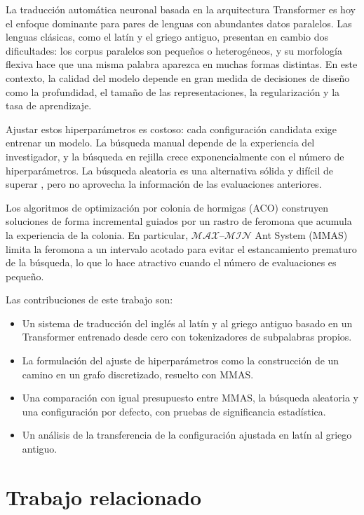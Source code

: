 \documentclass[conference]{IEEEtran}
\newcommand{\mmas}{$\mathcal{MAX}$--$\mathcal{MIN}$ Ant System}
\begin{document}
La traducción automática neuronal basada en la arquitectura Transformer
\cite{vaswani2017attention} es hoy el enfoque dominante para pares de
lenguas con abundantes datos paralelos. Las lenguas clásicas, como el
latín y el griego antiguo, presentan en cambio dos dificultades: los
corpus paralelos son pequeños o heterogéneos, y su morfología flexiva hace
que una misma palabra aparezca en muchas formas distintas. En este
contexto, la calidad del modelo depende en gran medida de decisiones de
diseño como la profundidad, el tamaño de las representaciones, la
regularización y la tasa de aprendizaje.

Ajustar estos hiperparámetros es costoso: cada configuración candidata
exige entrenar un modelo. La búsqueda manual depende de la experiencia
del investigador, y la búsqueda en rejilla crece exponencialmente con el
número de hiperparámetros. La búsqueda aleatoria es una alternativa
sólida y difícil de superar \cite{bergstra2012random}, pero no aprovecha
la información de las evaluaciones anteriores.

Los algoritmos de optimización por colonia de hormigas (ACO)
\cite{dorigo2004aco} construyen soluciones de forma incremental guiados
por un rastro de feromona que acumula la experiencia de la colonia. En
particular, \mmas{} (MMAS) \cite{stutzle2000mmas} limita la feromona a un
intervalo acotado para evitar el estancamiento prematuro de la búsqueda,
lo que lo hace atractivo cuando el número de evaluaciones es pequeño.

Las contribuciones de este trabajo son:
\begin{itemize}
  \item Un sistema de traducción del inglés al latín y al griego antiguo
  basado en un Transformer entrenado desde cero con tokenizadores de
  subpalabras propios.
  \item La formulación del ajuste de hiperparámetros como la construcción
  de un camino en un grafo discretizado, resuelto con MMAS.
  \item Una comparación con igual presupuesto entre MMAS, la búsqueda
  aleatoria y una configuración por defecto, con pruebas de significancia
  estadística.
  \item Un análisis de la transferencia de la configuración ajustada en
  latín al griego antiguo.
\end{itemize}

\section{Trabajo relacionado}
\end{document}
